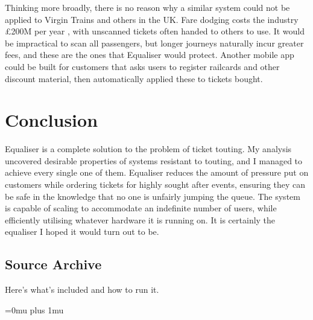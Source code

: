 \documentclass[12pt,a4paper]{bhamdissertation}
\begin{document}
Thinking more broadly, there is no reason why a similar system could not be applied to Virgin Trains and others in the UK. Fare dodging costs the industry £200M per year \cite{BM16}, with unscanned tickets often handed to others to use. It would be impractical to scan all passengers, but longer journeys naturally incur greater fees, and these are the ones that Equaliser would protect. Another mobile app could be built for customers that asks users to register railcards and other discount material, then automatically applied these to tickets bought.

\chapter{Conclusion}

Equaliser is a complete solution to the problem of ticket touting. My analysis uncovered desirable properties of systems resistant to touting, and I managed to achieve every single one of them. Equaliser reduces the amount of pressure put on customers while ordering tickets for highly sought after events, ensuring they can be safe in the knowledge that no one is unfairly jumping the queue. The system is capable of scaling to accommodate an indefinite number of users, while efficiently utilising whatever hardware it is running on. It is certainly the equaliser I hoped it would turn out to be.

\appendix
\begin{appendices}


\chapter{Source Archive}
\label{appendix:source_archive}

Here's what's included and how to run it.

\end{appendices}

\cleardoublepage  %
\Urlmuskip=0mu plus 1mu
\printbibliography
\end{document}
